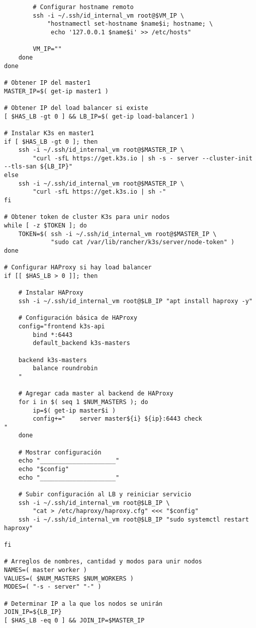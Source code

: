 \begin{verbatim}
        # Configurar hostname remoto
        ssh -i ~/.ssh/id_internal_vm root@$VM_IP \
            "hostnamectl set-hostname $name$i; hostname; \
             echo '127.0.0.1 $name$i' >> /etc/hosts"

        VM_IP=""
    done
done

# Obtener IP del master1
MASTER_IP=$( get-ip master1 )

# Obtener IP del load balancer si existe
[ $HAS_LB -gt 0 ] && LB_IP=$( get-ip load-balancer1 )

# Instalar K3s en master1
if [ $HAS_LB -gt 0 ]; then
    ssh -i ~/.ssh/id_internal_vm root@$MASTER_IP \
        "curl -sfL https://get.k3s.io | sh -s - server --cluster-init --tls-san ${LB_IP}"
else
    ssh -i ~/.ssh/id_internal_vm root@$MASTER_IP \
        "curl -sfL https://get.k3s.io | sh -"
fi

# Obtener token de cluster K3s para unir nodos
while [ -z $TOKEN ]; do
    TOKEN=$( ssh -i ~/.ssh/id_internal_vm root@$MASTER_IP \
             "sudo cat /var/lib/rancher/k3s/server/node-token" )
done

# Configurar HAProxy si hay load balancer
if [[ $HAS_LB > 0 ]]; then

    # Instalar HAProxy
    ssh -i ~/.ssh/id_internal_vm root@$LB_IP "apt install haproxy -y"

    # Configuración básica de HAProxy
    config="frontend k3s-api
        bind *:6443
        default_backend k3s-masters

    backend k3s-masters
        balance roundrobin
    "

    # Agregar cada master al backend de HAProxy
    for i in $( seq 1 $NUM_MASTERS ); do
        ip=$( get-ip master$i )
        config+="    server master${i} ${ip}:6443 check
"
    done

    # Mostrar configuración
    echo "_____________________"
    echo "$config"
    echo "_____________________"

    # Subir configuración al LB y reiniciar servicio
    ssh -i ~/.ssh/id_internal_vm root@$LB_IP \
        "cat > /etc/haproxy/haproxy.cfg" <<< "$config"
    ssh -i ~/.ssh/id_internal_vm root@$LB_IP "sudo systemctl restart haproxy"

fi

# Arreglos de nombres, cantidad y modos para unir nodos
NAMES=( master worker )
VALUES=( $NUM_MASTERS $NUM_WORKERS )
MODES=( "-s - server" "-" )

# Determinar IP a la que los nodos se unirán
JOIN_IP=${LB_IP}
[ $HAS_LB -eq 0 ] && JOIN_IP=$MASTER_IP


\end{verbatim}
